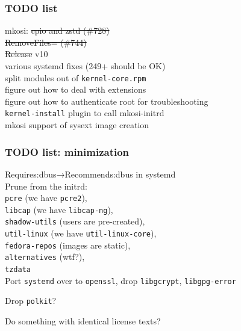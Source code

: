\documentclass[]{beamer}
\begin{document}
\begin{frame}
  \frametitle{TODO list}

  mkosi: \sout{cpio and zstd (\#728)}\\
  \phantom{mkosi: }\sout{RemoveFiles= (\#744)}\\
  \phantom{mkosi: }\sout{Release} v10\\

  various systemd fixes (249+ should be OK)\\

  split modules out of \texttt{kernel-core.rpm}\\

  figure out how to deal with extensions\\
  figure out how to authenticate root for troubleshooting\\

  \texttt{kernel-install} plugin to call mkosi-initrd\\

  mkosi support of sysext image creation
\end{frame}

\begin{frame}
  \frametitle{TODO list: minimization}

  Requires:dbus→Recommends:dbus in systemd\\

  Prune from the initrd:\\
  \texttt{pcre} (we have \texttt{pcre2}),\\
  \texttt{libcap} (we have \texttt{libcap-ng}),\\
  \texttt{shadow-utils} (users are pre-created),\\
  \texttt{util-linux} (we have \texttt{util-linux-core}),\\
  \texttt{fedora-repos} (images are static),\\
  \texttt{alternatives} (wtf?),\\
  \texttt{tzdata}\\

  Port \texttt{systemd} over to \texttt{openssl}, drop \texttt{libgcrypt}, \texttt{libgpg-error}

  Drop \texttt{polkit}?

  Do something with identical license texts?
\end{frame}
\end{document}
